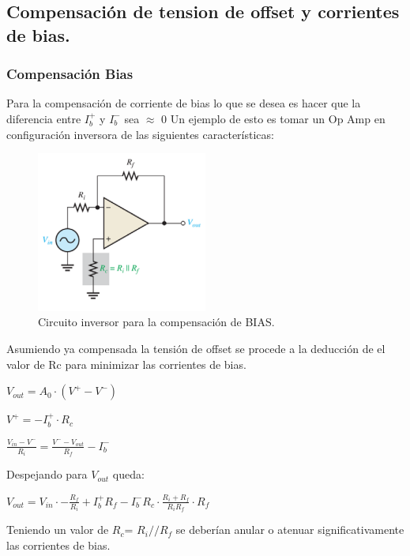 \subsection{Compensación de tension de offset y corrientes de bias.}
\subsubsection{Compensación Bias}
Para la compensación de corriente de bias lo que se desea es hacer que la diferencia entre $I_b^+$ y $I_b^-$ sea $\approx$ 0
Un ejemplo de esto es tomar un Op Amp en configuración inversora  de las siguientes características:
\begin{figure}[H]	
	\centering
	\includegraphics[width=0.5\textwidth]{Ej3/imagenes/CompensacionBias.PNG}
	\caption{Circuito inversor para la compensación de BIAS.}
	\label{fig:CompensacionBias}
\end{figure}
Asumiendo ya compensada la tensión de offset se procede a la deducción de el valor de Rc para minimizar las corrientes de bias.
\begin{center}$V_{out}=A_0 \cdot (V^+ - V^-)$\\\end{center}
\begin{center}$V^+=-I_b^+ \cdot R_c$\\\end{center}
\begin{center}$\frac{V_{in}-V^-}{R_i}=\frac{V^- - V_{out}}{R_f} -I_b^-$\\\end{center}
Despejando para $V_{out}$ queda:
\begin{center}$V_{out}=V_{in}\cdot -\frac{R_f}{R_i}+I_b^+ R_f-I_b^- R_c \cdot \frac{R_i+R_f}{R_i R_f}\cdot R_f $\\\end{center}
Teniendo un valor de $R_c$= $R_i//R_f$ se deberían anular o atenuar significativamente las corrientes de bias.
